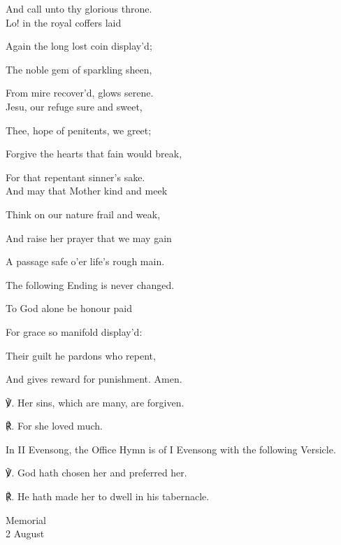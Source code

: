 \begin{paracol}{2}[]
\begin{hangparas}{1.25em}{1}
And call unto thy glorious throne.\\

Lo! in the royal coffers laid

Again the long lost coin display'd;

The noble gem of sparkling sheen,

From mire recover'd, glows serene.\\

Jesu, our refuge sure and sweet,

Thee, hope of penitents, we greet;

Forgive the hearts that fain would break,

For that repentant sinner's sake.\\

And may that Mother kind and meek

Think on our nature frail and weak,

And raise her prayer that we may gain

A passage safe o'er life's rough main.\\

\begin{rubric}
	The following Ending is never changed.
\end{rubric}

To God alone be honour paid

For grace so manifold display'd:

Their guilt he pardons who repent,

And gives reward for punishment. Amen.\\
\end{hangparas}

    ℣. Her sins, which are many, are forgiven.

	℟. For she loved much.

\fussy
\end{paracol}

\begin{rubric}
	In II Evensong, the Office Hymn is of I Evensong with the following Versicle.
\end{rubric}

    ℣. God hath chosen her and preferred her.

	℟. He hath made her to dwell in his tabernacle.


\begin{inhead}
    {Memorial\\
2 August}
\end{inhead}

